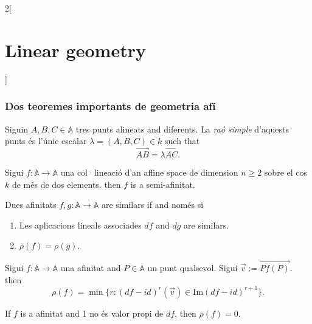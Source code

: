\documentclass[class=article,10pt,crop=false]{standalone}
\begin{document}
\begin{multicols}{2}[\section{Linear geometry}]
\subsubsection{Dos teoremes importants de geometria afí}
\begin{definition}
Siguin $A,B,C\in\mathbb{A}$ tres punts alineats and diferents. La \textit{raó simple} d'aquests punts és l'únic escalar $\lambda=(A,B,C)\in k$ such that $$\overrightarrow{AB}=\lambda\overrightarrow{AC}.$$
\begin{theorem}
Sigui $f:\mathbb{A}\rightarrow\mathbb{A}$ una col·lineació d'an affine space de dimension $n\geq 2$ sobre el cos $k$ de més de dos elements. then $f$ is a semi-afinitat.
\end{theorem}
\begin{prop}
Dues afinitats $f,g:\mathbb{A}\rightarrow\mathbb{A}$ are similars if and només si
\begin{enumerate}
    \item Les aplicacions lineals associades $df$ and $dg$ are similars.
    \item $\rho(f)=\rho(g)$.
\end{enumerate}
\end{prop}
\begin{theorem}
Sigui $f:\mathbb{A}\rightarrow\mathbb{A}$ una afinitat and $P\in\mathbb{A}$ un punt qualsevol. Sigui $\overrightarrow{v}:=\overrightarrow{Pf(P)}$. then $$\rho(f)=\min\{r:(df-id)^r(\overrightarrow{v})\in\text{Im}(df-id)^{r+1}\}.$$
\end{theorem}
\begin{corollary}
If $f$ is a afinitat and 1 no és valor propi de $df$, then $\rho(f)=0$.
\end{corollary}
\end{definition}

\end{multicols}
\end{document}
